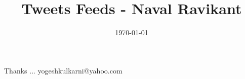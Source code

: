 \documentclass[xcolor=dvipsnames,compress,t,pdf]{beamer}
\title[How to get rich\hspace{4cm} \insertframenumber /\inserttotalframenumber]
{Tweets Feeds - Naval Ravikant}
\subtitle[]{}
\date[2014]{\today}
\begin{document}
\begin{frame}
\titlepage
\end{frame}




\begin{frame}[c]{}
Thanks ...
\vspace{5mm}
yogeshkulkarni@yahoo.com
\end{frame}
\end{document}
